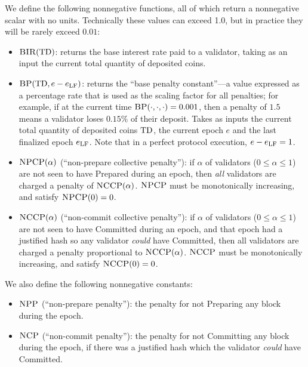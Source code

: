 \documentclass[12pt, final]{article}
\newcommand{\epoch}{\ensuremath{e}\xspace}
\newcommand{\BIR}{\textsc{BIR}\xspace}
\newcommand{\BP}{\textsc{BP}\xspace}
\newcommand{\NCP}{\textsc{NCP}\xspace}
\newcommand{\NCCP}{\textsc{NCCP}\xspace}
\newcommand{\NPP}{\textsc{NPP}\xspace}
\newcommand{\NPCP}{\textsc{NPCP}\xspace}
\newcommand{\totaldeposit}{\textnormal{TD}\xspace}
\newcommand{\epochLF}{\ensuremath{\epoch_{\textnormal{LF}}}\xspace}
\begin{document}
We define the following nonnegative functions, all of which return a nonnegative scalar with no units.  Technically these values can exceed 1.0, but in practice they will be rarely exceed $0.01$: 

\begin{itemize}
\item $\BIR(\totaldeposit)$: returns the base interest rate paid to a validator, taking as an input the current total quantity of deposited coins.

\item $\BP(\totaldeposit, \epoch - \epochLF )$: returns the ``base penalty constant''---a value expressed as a percentage rate that is used as the scaling factor for all penalties; for example, if at the current time $\BP(\cdot, \cdot, \cdot) = 0.001$, then a penalty of $1.5$ means a validator loses $0.15\%$ of their deposit. Takes as inputs the current total quantity of deposited coins $\totaldeposit$, the current epoch $e$ and the last finalized epoch \epochLF. Note that in a perfect protocol execution, $\epoch - \epochLF = 1$.

\item $\NPCP(\alpha)$ (``non-prepare collective penalty''): if $\alpha$ of validators ($0 \leq \alpha \leq 1$) are not seen to have Prepared during an epoch, then \emph{all} validators are charged a penalty of $\NCCP(\alpha)$. $\NPCP$ must be monotonically increasing, and satisfy $\NPCP(0) = 0$.

\item $\NCCP(\alpha)$ (``non-commit collective penalty''): if $\alpha$ of validators ($0 \leq \alpha \leq 1$) are not seen to have Committed during an epoch, and that epoch had a justified hash so any validator \emph{could} have Committed, then all validators are charged a penalty proportional to $\NCCP(\alpha)$. $\NCCP$ must be monotonically increasing, and satisfy $\NCCP(0) = 0$.
\end{itemize}

We also define the following nonnegative constants:
\begin{itemize}
    \item $\NPP$ (``non-prepare penalty''): the penalty for not Preparing any block during the epoch. 
    \item $\NCP$ (``non-commit penalty''): the penalty for not Committing any block during the epoch, if there was a justified hash which the validator \emph{could} have Committed. 
\end{itemize}
\end{document}
